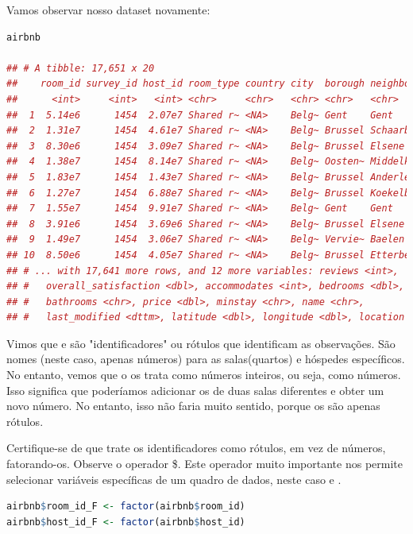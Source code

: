 \documentclass{article}
\begin{document}
Vamos observar nosso dataset novamente:

\begin{lstlisting}[language=R]
airbnb

## # A tibble: 17,651 x 20
##    room_id survey_id host_id room_type country city  borough neighborhood
##      <int>     <int>   <int> <chr>     <chr>   <chr> <chr>   <chr>       
##  1  5.14e6      1454  2.07e7 Shared r~ <NA>    Belg~ Gent    Gent        
##  2  1.31e7      1454  4.61e7 Shared r~ <NA>    Belg~ Brussel Schaarbeek  
##  3  8.30e6      1454  3.09e7 Shared r~ <NA>    Belg~ Brussel Elsene      
##  4  1.38e7      1454  8.14e7 Shared r~ <NA>    Belg~ Oosten~ Middelkerke 
##  5  1.83e7      1454  1.43e7 Shared r~ <NA>    Belg~ Brussel Anderlecht  
##  6  1.27e7      1454  6.88e7 Shared r~ <NA>    Belg~ Brussel Koekelberg  
##  7  1.55e7      1454  9.91e7 Shared r~ <NA>    Belg~ Gent    Gent        
##  8  3.91e6      1454  3.69e6 Shared r~ <NA>    Belg~ Brussel Elsene      
##  9  1.49e7      1454  3.06e7 Shared r~ <NA>    Belg~ Vervie~ Baelen      
## 10  8.50e6      1454  4.05e7 Shared r~ <NA>    Belg~ Brussel Etterbeek   
## # ... with 17,641 more rows, and 12 more variables: reviews <int>,
## #   overall_satisfaction <dbl>, accommodates <int>, bedrooms <dbl>,
## #   bathrooms <chr>, price <dbl>, minstay <chr>, name <chr>,
## #   last_modified <dttm>, latitude <dbl>, longitude <dbl>, location <chr>
\end{lstlisting}

Vimos que  e  são "identificadores" ou rótulos que identificam as observações. São nomes (neste caso, apenas números) para as salas(quartos) e hóspedes específicos. No entanto, vemos que o \faRProject os trata como números inteiros, ou seja, como números. Isso significa que poderíamos adicionar os  de duas salas diferentes e obter um novo número. No entanto, isso não faria muito sentido, porque os  são apenas rótulos.

Certifique-se de que \faRProject trate os identificadores como rótulos, em vez de números, fatorando-os. Observe o operador \$. Este operador muito importante nos permite selecionar variáveis específicas de um quadro de dados, neste caso  e .

\begin{lstlisting}[language=R]
airbnb$room_id_F <- factor(airbnb$room_id)
airbnb$host_id_F <- factor(airbnb$host_id)
\end{lstlisting}
\end{document}
